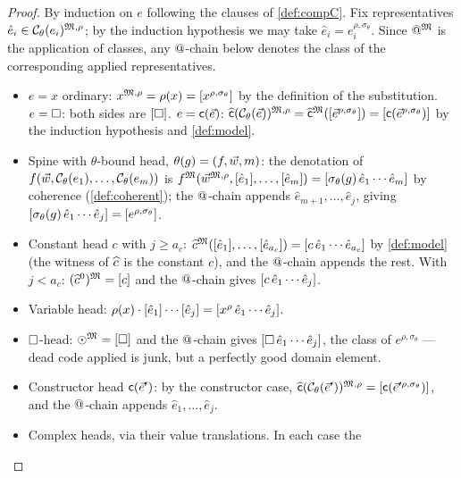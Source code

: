\begin{proof}
By induction on $e$ following the clauses of \cref{def:compC}.  Fix
representatives $\hat{e}_i \in \mathcal{C}_\theta(e_i)^{\mathfrak{M},\rho}$; by the
induction hypothesis we may take $\hat{e}_i = e_i^{\rho,
\sigma_\theta}$.  Since $\mathbin{@}^{\mathfrak{M}}$ is the application of classes,
any $\mathbin{@}$-chain below denotes the class of the corresponding applied
representatives.
\begin{itemize}[leftmargin=2em]
\item $e = x$ ordinary: $x^{\mathfrak{M},\rho} = \rho(x) =
  [x^{\rho,\sigma_\theta}]$ by the definition of the substitution.
  $e = \square$: both sides are $[\square]$.  $e = \mathsf{c}(\vec{e})$:
  $\widehat{\mathsf{c}}(\mathcal{C}_\theta(\vec{e}))^{\mathfrak{M},\rho} =
  \widehat{\mathsf{c}}^{\mathfrak{M}}([\vec{e}^{\rho,\sigma_\theta}]) =
  [\mathsf{c}(\vec{e}^{\rho,\sigma_\theta})]$ by the induction
  hypothesis and \cref{def:model}.
\item Spine with $\theta$-bound head, $\theta(g) = (f, \vec{w}, m)$:
  the denotation of $f(\vec{w}, \mathcal{C}_\theta(e_1), \dots,
  \mathcal{C}_\theta(e_m))$ is $f^{\mathfrak{M}}(\vec{w}^{\mathfrak{M},\rho},
  [\hat{e}_1], \dots, [\hat{e}_m]) =
  [\sigma_\theta(g)\,\hat{e}_1 \cdots \hat{e}_m]$ by coherence
  (\cref{def:coherent}); the $\mathbin{@}$-chain appends $\hat{e}_{m+1},
  \dots, \hat{e}_j$, giving $[\sigma_\theta(g)\,\hat{e}_1 \cdots
  \hat{e}_j] = [e^{\rho,\sigma_\theta}]$.
\item Constant head $c$ with $j \geq a_c$:
  $\widehat{c}^{\mathfrak{M}}([\hat{e}_1], \dots, [\hat{e}_{a_c}]) =
  [c\,\hat{e}_1 \cdots \hat{e}_{a_c}]$ by \cref{def:model} (the
  witness of $\widehat{c}$ is the constant $c$), and the $\mathbin{@}$-chain
  appends the rest.  With $j < a_c$: $(\widehat{c}^0)^{\mathfrak{M}} = [c]$ and
  the $\mathbin{@}$-chain gives $[c\,\hat{e}_1 \cdots \hat{e}_j]$.
\item Variable head: $\rho(x) \cdot [\hat{e}_1] \cdots
  [\hat{e}_j] = [x^{\rho}\,\hat{e}_1 \cdots \hat{e}_j]$.
\item $\square$-head: $\odot^{\mathfrak{M}} = [\square]$ and the $\mathbin{@}$-chain gives
  $[\square\,\hat{e}_1 \cdots \hat{e}_j]$, the class of
  $e^{\rho,\sigma_\theta}$ --- dead code applied is junk, but a
  perfectly good domain element.
\item Constructor head $\mathsf{c}(\vec{e}')$: by the constructor case,
  $\widehat{\mathsf{c}}(\mathcal{C}_\theta(\vec{e}'))^{\mathfrak{M},\rho} =
  [\mathsf{c}(\vec{e}'^{\rho,\sigma_\theta})]$, and the
  $\mathbin{@}$-chain appends $\hat{e}_1, \dots, \hat{e}_j$.
\item Complex heads, via their value translations.  In each case the

\end{itemize}
\end{proof}

